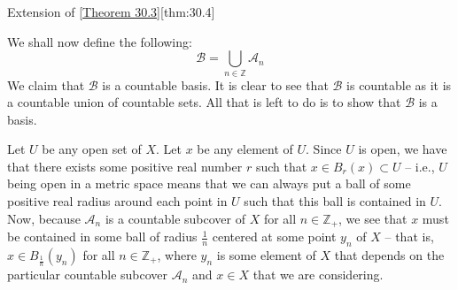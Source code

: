\begin{thmBox}{Extension of [\hyperlink{thm:30.3}{Theorem 30.3}]}[thm:30.4]
\begin{proofBox}
        \baseSkip
    
        We shall now define the following:
        \begin{equation*}
            \mathcal{B}
            =
            \bigcup_{ n \in \mathbb{Z} } \mathcal{A}_{ n }
        \end{equation*}
        We claim that \( \mathcal{B} \) is a countable basis.
        It is clear to see that \( \mathcal{B} \) is countable as it is a countable 
        union of countable sets. 
        All that is left to do is to show that \( \mathcal{B} \) is a basis.
        
        \baseSkip
    
        Let \( U \) be any open set of \( X \).
        Let \( x \) be any element of \( U \).
        Since \( U \) is open, we have that there exists some positive real number 
        \( r \) such that \( x \in B_{ r }( x ) \subset U \) -- i.e., \( U \) being 
        open in a metric space means that we can always put a ball of some positive 
        real radius around each point in \( U \) such that this ball is contained in 
        \( U \).
        Now, because \( \mathcal{A}_{ n } \) is a countable subcover of \( X \) for all 
        \( n \in \mathbb{Z}_{ + } \), we see that \( x \) must be contained in some
        ball of radius \( \frac{ 1 }{ n } \) centered at some point \( y_{ n } \) of
        \( X \) -- that is, \( x \in B_{ \frac{ 1 }{ n } }( y_{ n } ) \) for all 
        \( n \in \mathbb{Z}_{ + } \), where \( y_{ n } \) is some element of \( X \) 
        that depends on the particular countable subcover \( \mathcal{A}_{ n } \) and 
        \( x \in X \) that we are considering.
    
        \baseSkip
    

\end{proofBox}
\end{thmBox}
